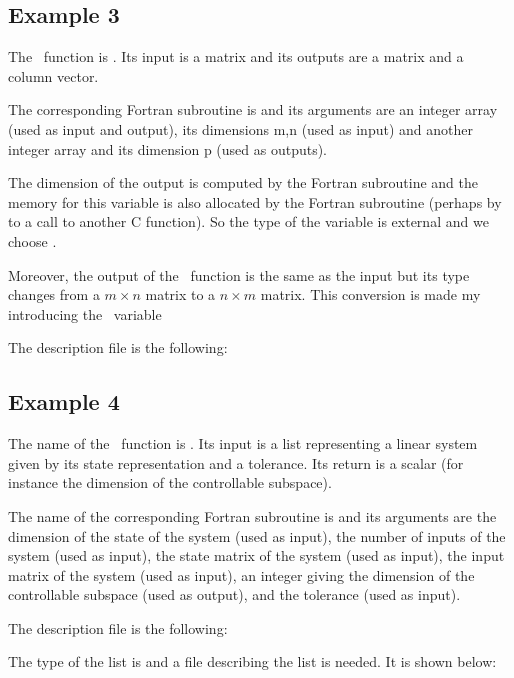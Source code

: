 \documentclass[11pt]{article}
\begin{document}
\subsection{Example 3}
\label{ex3}

The \SCI\ function is . Its input is a matrix and its
outputs are a matrix and a column vector.

The corresponding Fortran subroutine is  and its arguments
are an integer array (used as input and output), its dimensions m,n (used as
input) and another integer array and its dimension p (used as outputs).

The dimension  of the output  is computed by the Fortran subroutine
and the memory for this variable is also allocated by the Fortran subroutine
(perhaps by to a call to another C function). So the type of the variable is
external and we choose .

Moreover, the output  of the \SCI\ function is the same as the input
but its type changes from a $m \times n$ matrix to a $n \times m$ matrix. This
conversion is made my introducing the \SCI\ variable 

The description file is the following:



\subsection{Example 4}
\label{ex4}

The name of the \SCI\ function is . Its input is a list representing
a linear system given by its state representation and a tolerance. Its return
is a scalar (for instance the dimension of the controllable subspace).

The name of the corresponding Fortran subroutine is  and its
arguments are the dimension of the state of the system (used as input), the
number of inputs of the system (used as input), 
the state matrix of the system (used as input),
the input matrix of the system (used as input),
an integer giving the dimension of the controllable subspace (used as output),
and the tolerance (used as input).

The description file is the following:



The type of the list is  and a file describing the list  is
needed. It is shown below:
\end{document}
